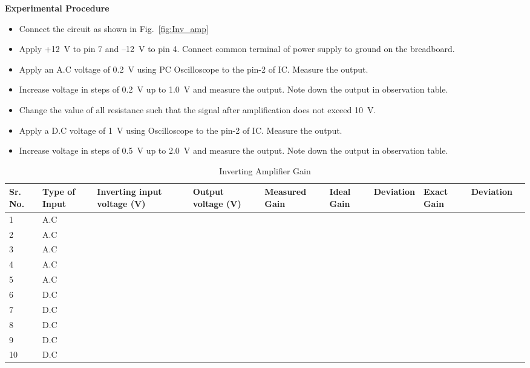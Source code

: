 \documentclass[9pt]{scrreprt}
\begin{document}
\textbf{Experimental Procedure}
\begin{itemize}
\item Connect the circuit as shown in Fig.~\ref{fig:Inv_amp}
\item Apply +12~V to pin 7 and –12~V to pin 4. Connect common terminal of power supply to ground on the breadboard.
\item Apply an A.C voltage of 0.2~V using PC Oscilloscope to the pin-2 of IC. Measure the output.
\item Increase voltage in steps of 0.2~V up to 1.0~V and measure the output. Note down the output in observation table.
\item Change the value of all resistance such that the signal after amplification does not exceed 10~V.
\item Apply a D.C voltage of 1~V using Oscilloscope to the pin-2 of IC. Measure the output.
\item Increase voltage in steps of 0.5~V up to 2.0~V and measure the output. Note down the output in observation table.
\end{itemize}

\begin{table}[H]
\centering
\caption{Inverting Amplifier Gain}
\begin{tabularx}{\textwidth}{|p{0.5cm}|X|X|X|X|X|X|X|X|X|}
\hline
\textbf{Sr. No.} & \textbf{Type of Input} & \textbf{Inverting input voltage (V)} & \textbf{Output voltage (V)} & \textbf{Measured Gain} & \textbf{Ideal Gain} & \textbf{Deviation} & \textbf{Exact Gain} & \textbf{Deviation} \\ \hline
1  & \centering A.C 		  &   &   &   &   &   &   &   \\ \hline
2  & \centering A.C          &   &   &   &   &   &   &   \\ \hline
3  & \centering A.C          &   &   &   &   &   &   &   \\ \hline
4  & \centering A.C          &   &   &   &   &   &   &   \\ \hline
5  & \centering A.C		  &   &   &   &   &   &   &   \\ \hline
6  & \centering D.C          &   &   &   &   &   &   &   \\ \hline
7  & \centering D.C          &   &   &   &   &   &   &   \\ \hline
8  & \centering D.C          &   &   &   &   &   &   &   \\ \hline
9  & \centering D.C          &   &   &   &   &   &   &   \\ \hline
10 & \centering D.C          &   &   &   &   &   &   &   \\ \hline
\end{tabularx}
\label{tab:Inverting amplifier gain}
\end{table}
\end{document}
